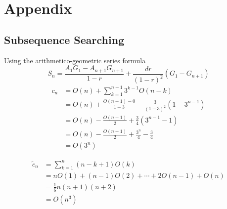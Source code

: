 \chapter*{Appendix} \label{chap:appendix}

\section{Subsequence Searching}


Using the arithmetico-geometric series formula
\[
	S_n = \frac{A_1G_1-A_{n+1}G_{n+1}}{1-r} +\frac{dr}{(1-r)^2}(G_1-G_{n+1})
\]
\label{app:cn}
\begin{align*}
	c_n &= O(n) + \sum_{k=1}^{n-1}3^{k-1}O(n-k)\\
	&= O(n) + \frac{O(n-1) - 0}{1-3} - \frac{3}{(1-3)^2}(1-3^{n-1})\\
	&= O(n) - \frac{O(n-1)}{2} +\frac{3}{4}(3^{n-1}-1)\\
	&= O(n) - \frac{O(n-1)}{2} + \frac{3^n}{4} - \frac{3}{4}\\
	&= O(3^n)
\end{align*}

\label{app:cn-dyn}
\begin{align*}
	\tilde c_n &= \sum_{k=1}^n(n-k+1)O(k)\\
	&= n O(1) + (n-1) O(2) +\cdots + 2 O(n-1) + O(n)\\
	&= \frac{1}{6}n(n+1)(n+2)\\
	&= O(n^3)
\end{align*}
